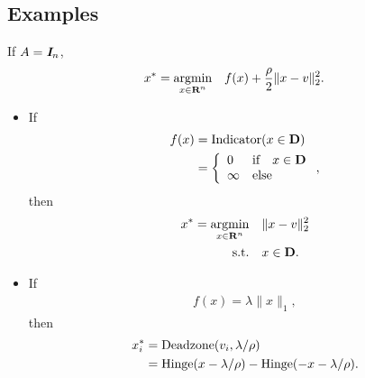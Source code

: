 \documentclass{article}
\begin{document}
\subsection{Examples}
    If $A=\emph{\textbf{I}}_n$,
    \begin{align*}
        x^* = \underset{x\in\textbf{R}^n}{\text{argmin}}\quad f(x)+\frac{\rho}{2}\|x-v\|_2^2.
    \end{align*}

    \begin{itemize}
        \item If 
        \begin{align*}
            f(x)&=\text{Indicator}(x\in\textbf{D})\\
            &=\left\{ \begin{array}{lllllllllllllllllll}
                    0 & \text{if}\quad x\in\textbf{D}\\
                    \infty & \text{else}
                \end{array}\right.,
        \end{align*}
        then
            \begin{align*}
                x^*=\underset{x\in\textbf{R}^n}{\text{argmin}}\quad &\|x-v\|_2^2\\
                \text{s.t.} \quad &x\in\textbf{D}.
            \end{align*}
        \item If
            \begin{align*}
                f(x)=\lambda\|x\|_1,
            \end{align*}
            then
            \begin{align*}
                x^*_i &= \text{Deadzone}(v_i,\lambda/\rho)\\
                    &=\text{Hinge}(x-\lambda/\rho)-\text{Hinge}(-x-\lambda/\rho).
            \end{align*}


\end{itemize}
\end{document}
